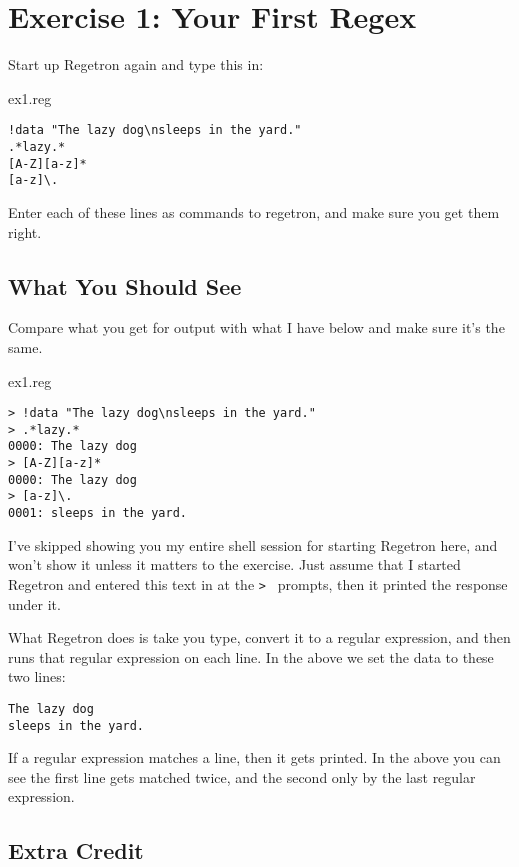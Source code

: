 \chapter{Exercise 1: Your First Regex}

Start up Regetron again and type this in:

\begin{code}{ex1.reg}
\begin{Verbatim}
!data "The lazy dog\nsleeps in the yard."
.*lazy.*
[A-Z][a-z]*
[a-z]\.
\end{Verbatim}
\end{code}

Enter each of these lines as commands to regetron, and make sure you get
them right.

\section{What You Should See}

Compare what you get for output with what I have below and
make sure it's the same.

\begin{code}{ex1.reg}
\begin{Verbatim}
> !data "The lazy dog\nsleeps in the yard."
> .*lazy.*
0000: The lazy dog
> [A-Z][a-z]*
0000: The lazy dog
> [a-z]\.
0001: sleeps in the yard.
\end{Verbatim}
\end{code}

I've skipped showing you my entire shell session for starting
Regetron here, and won't show it unless it matters to the exercise.
Just assume that I started Regetron and entered this text in at the
\verb|> | prompts, then it printed the response under it.

What Regetron does is take you type, convert it to a regular expression,
and then runs that regular expression on each line.  In the above
we set the data to these two lines:

\begin{Verbatim}
The lazy dog
sleeps in the yard.
\end{Verbatim}

If a regular expression matches a line, then it gets printed.  In the
above you can see the first line gets matched twice, and the second
only by the last regular expression.

\section{Extra Credit}

